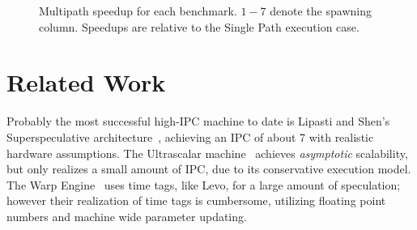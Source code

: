 \documentclass[10pt,dvips]{article}
\begin{document}
\begin{figure}
\vspace{0.2 in}
\setlength{\epsfxsize}{14cm}%
\centerline{}
\caption{ Multipath speedup for each benchmark.  $1-7$ denote the
spawning column. 
Speedups are relative to the Single Path execution case.}
\label{fig:figall}
\end{figure}
%
%
%
%
%
%
\section{Related Work}
%
Probably the most successful high-IPC machine to date is
Lipasti and Shen's Superspeculative
architecture~\cite{Lip97}, achieving an IPC of
about 7 with realistic hardware assumptions.
The Ultrascalar machine~\cite{Hen00}
achieves {\em asymptotic} scalability,
but only realizes a small amount of IPC,
due to its conservative execution model.
The Warp Engine~\cite{Cle95}
uses time tags, like Levo, for a large amount of speculation;
however their realization of time
tags is cumbersome, utilizing floating point
numbers and machine wide parameter updating.
\end{document}
